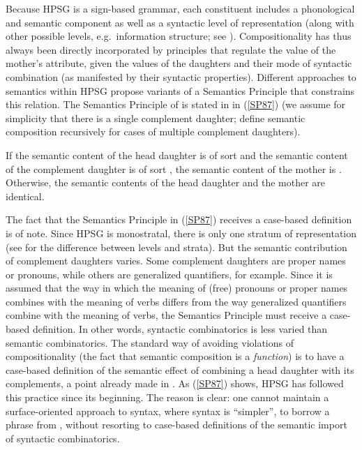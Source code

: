 \documentclass[output=paper
 	        ,biblatex
                ,babelshorthands
                ,newtxmath
                ,draftmode
                ,colorlinks, citecolor=brown
]{langscibook}
\begin{document}
Because HPSG is a sign-based grammar, each constituent includes a phonological and semantic
component as well as a syntactic level of representation (along with other possible levels, e.g.\
information structure; see ). Compositionality has thus
always been directly incorporated by principles that regulate the value of the mother's 
attribute, given the \attrib{sem} values of the daughters and their mode of syntactic combination
(as manifested by their syntactic properties). Different approaches to semantics within HPSG propose
variants of a Semantics Principle\is{principle!Semantics} that constrains this relation. The Semantics Principle of
\citet[109]{PollardandSag1987} is stated in \ili{English} in (\ref{SP87}) (we assume for simplicity
that there is a single complement daughter; \citeauthor{PollardandSag1987} define semantic
composition recursively for cases of multiple complement daughters).

\eal \label{SP87}
\ex
If the semantic content  of the head daughter is of sort  and the semantic content  of the complement daughter is of sort , the semantic content of the mother is .\\
\ex Otherwise, the semantic contents of the head daughter and the mother are identical.
\zl

The fact that the Semantics Principle in (\ref{SP87}) receives a case-based definition is of
note. Since HPSG is monostratal, there is only one stratum of representation (see
\citealt{Ladusaw1988b} for the difference between levels and strata). But the semantic contribution
of complement daughters varies. Some complement daughters are proper names or pronouns, while others
are generalized quantifiers, for example. Since it is assumed that the way in which the meaning of
(free) pronouns or proper names combines with the meaning of verbs differs from the way generalized
quantifiers combine with the meaning of verbs, the Semantics Principle must receive a case-based
definition. In other words, syntactic combinatorics is less varied than semantic combinatorics. The
standard way of avoiding violations of compositionality (the fact that semantic composition is a
\emph{function}) is to have a case-based definition of the semantic effect of combining a head
daughter with its complements, a point already made in \citet{Partee1984a}. As (\ref{SP87}) shows,
HPSG has followed this practice since its beginning. The reason is clear: one cannot maintain a
surface-oriented approach to syntax, where syntax is ``simpler'', to borrow a phrase from
\citet{CulicoverandJackendoff2005}, without resorting to case-based definitions of the semantic
import of syntactic combinatorics.
\end{document}
